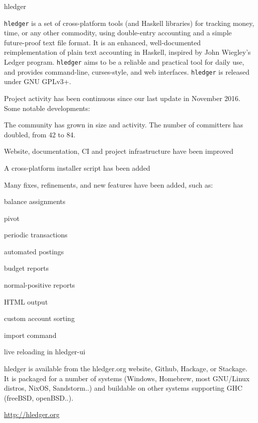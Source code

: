 \begin{hcarentry}{hledger}
\label{hledger}
\makeheader

{\tt hledger} is a set of cross-platform tools (and Haskell libraries) for tracking money, time, or any other commodity, using double-entry accounting and a simple future-proof text file format.
It is an enhanced, well-documented reimplementation of plain text accounting in Haskell, inspired by John Wiegley's Ledger program.
{\tt hledger} aims to be a reliable and practical tool for daily use, and provides command-line, curses-style, and web interfaces.
{\tt hledger} is released under GNU GPLv3+.

Project activity has been continuous since our last update in November 2016.
Some notable developments:

\begin{compactitem}
\item The community has grown in size and activity. The number of committers has doubled, from 42 to 84.
\item Website, documentation, CI and project infrastructure have been improved
\item A cross-platform installer script has been added
\item Many fixes, refinements, and new features have been added, such as:
\item balance assignments
\item pivot
\item periodic transactions
\item automated postings
\item budget reports
\item normal-positive reports
\item HTML output
\item custom account sorting
\item import command
\item live reloading in hledger-ui
\end{compactitem}

hledger is available from the hledger.org website, Github, Hackage, or Stackage.
It is packaged for a number of systems (Windows, Homebrew, most GNU/Linux distros, NixOS, Sandstorm..)
and buildable on other systems supporting GHC (freeBSD, openBSD..).

\FurtherReading
  \url{http://hledger.org}
\end{hcarentry}
